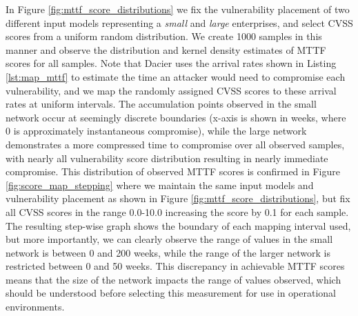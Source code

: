 
In Figure \ref{fig:mttf_score_distributions} we fix the vulnerability placement of two different input models representing a \textit{small} and \textit{large} enterprises, and select CVSS scores from a uniform random distribution. We create 1000 samples in this manner and observe the distribution and kernel density estimates of MTTF\cite{Dacier_Deswarte_Kaaniche} scores for all samples. Note that Dacier uses the arrival rates shown in Listing \ref{lst:map_mttf} to estimate the time an attacker would need to compromise each vulnerability, and we map the randomly assigned CVSS scores to these arrival rates at uniform intervals. The accumulation points observed in the small network occur at seemingly discrete boundaries (x-axis is shown in weeks, where 0 is approximately instantaneous compromise), while the large network demonstrates a more compressed time to compromise over all observed samples, with nearly all vulnerability score distribution resulting in nearly immediate compromise. This distribution of observed MTTF scores is confirmed in Figure \ref{fig:score_map_stepping} where we maintain the same input models and vulnerability placement as shown in Figure \ref{fig:mttf_score_distributions}, but fix all CVSS scores in the range 0.0-10.0 increasing the score by 0.1 for each sample. The resulting step-wise graph shows the boundary of each mapping interval used, but more importantly, we can clearly observe the range of values in the small network is between 0 and 200 weeks, while the range of the larger network is restricted between 0 and 50 weeks. This discrepancy in achievable MTTF scores means that the size of the network impacts the range of values observed, which should be understood before selecting this measurement for use in operational environments.

